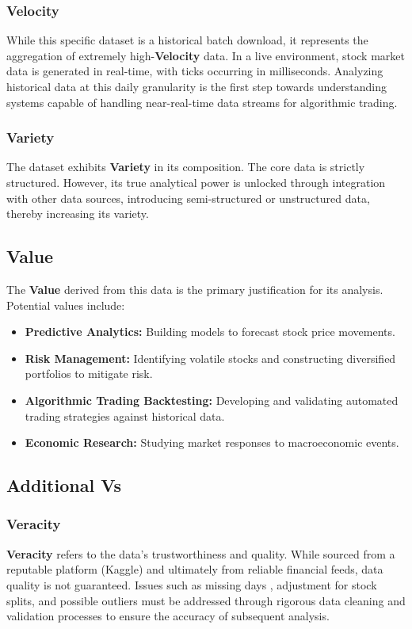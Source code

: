 \documentclass[12pt,a4paper]{article}
\begin{document}
\subsubsection{Velocity}
While this specific dataset is a historical batch download, it represents the aggregation of extremely high-\textbf{Velocity} data. In a live environment, stock market data is generated in real-time, with ticks occurring in milliseconds. Analyzing historical data at this daily granularity is the first step towards understanding systems capable of handling near-real-time data streams for algorithmic trading.

\subsubsection{Variety}
The dataset exhibits \textbf{Variety} in its composition. The core data is strictly structured. However, its true analytical power is unlocked through integration with other data sources, introducing semi-structured or unstructured data, thereby increasing its variety.

\subsection{Value}
The \textbf{Value} derived from this data is the primary justification for its analysis. Potential values include:
\begin{itemize}
    \item \textbf{Predictive Analytics:} Building models to forecast stock price movements.
    \item \textbf{Risk Management:} Identifying volatile stocks and constructing diversified portfolios to mitigate risk.
    \item \textbf{Algorithmic Trading Backtesting:} Developing and validating automated trading strategies against historical data.
    \item \textbf{Economic Research:} Studying market responses to macroeconomic events.
\end{itemize}

\subsection{Additional Vs}

\subsubsection{Veracity}
\textbf{Veracity} refers to the data's trustworthiness and quality. While sourced from a reputable platform (Kaggle) and ultimately from reliable financial feeds, data quality is not guaranteed. Issues such as missing days , adjustment for stock splits, and possible outliers must be addressed through rigorous data cleaning and validation processes to ensure the accuracy of subsequent analysis.
\end{document}
